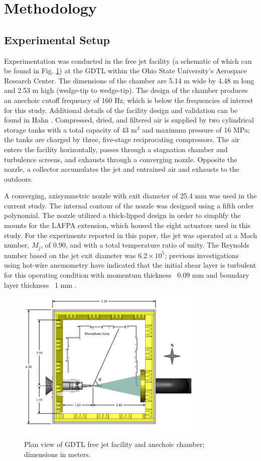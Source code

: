 \documentclass[english]{aiaa-tc}
\begin{document}
\section{Methodology}
\subsection{Experimental Setup\label{expersetup}}
Experimentation was conducted in the free jet facility (a schematic of which can be found in Fig. \ref{GDTLschematic}) at the GDTL within the Ohio State University's Aerospace Research Center.
The dimensions of the chamber are 5.14 m wide by 4.48 m long and 2.53 m high (wedge-tip to wedge-tip).
The design of the chamber produces an anechoic cutoff frequency of 160 Hz, which is below the frequencies of interest for this study.
Additional details of the facility design and validation can be found in Hahn \cite{Hahn2011}.
Compressed, dried, and filtered air is supplied by two cylindrical storage tanks with a total capacity of 43 m$^3$ and maximum pressure of 16 MPa; the tanks are charged by three, five-stage reciprocating compressors.
The air enters the facility horizontally, passes through a stagnation chamber and turbulence screens, and exhausts through a converging nozzle.
Opposite the nozzle, a collector accumulates the jet and entrained air and exhausts to the outdoors.

A converging, axisymmetric nozzle with exit diameter of 25.4 mm was used in the current study.
The internal contour of the nozzle was designed using a fifth order polynomial. The nozzle utilized a thick-lipped design in order to simplify the mounts for the LAFPA extension, which housed the eight actuators used in this study.
For the experiments reported in this paper, the jet was operated at a Mach number, $M_{j}$, of 0.90, and with a total temperature ratio of unity.
The Reynolds number based on the jet exit diameter was $6.2 \times 10^{5}$; previous investigations using hot-wire anemometry have indicated that the initial shear layer is turbulent for this operating condition with momentum thickness ~0.09 mm and boundary layer thickness ~1 mm \cite{kfm2009-1}.
\begin{figure}
	\begin{center}
		\includegraphics[width=3.5in]{GDTL_facility_schematic.png}
		\caption{Plan view of GDTL free jet facility and anechoic chamber; dimensions in meters.}\label{GDTLschematic}
	\end{center}
\end{figure}
	
\end{document}
